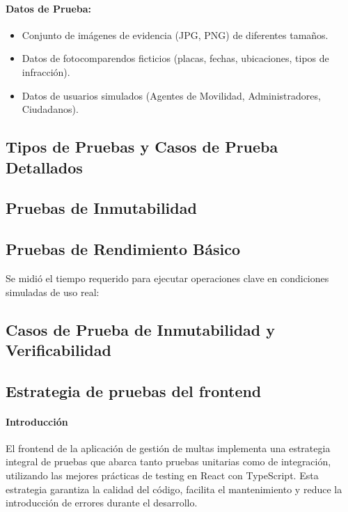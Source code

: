 \documentclass[
    letterpaper, 
    man,   
    spanish,
    12pt,
    donotrepeattitle,
    floatsintext,
    hidelinks %
]{apa7}
\begin{document}
\paragraph{Datos de Prueba:}
\begin{itemize}
    \item Conjunto de imágenes de evidencia (JPG, PNG) de diferentes tamaños. 
    \item Datos de fotocomparendos ficticios (placas, fechas, ubicaciones, tipos de infracción). 
    \item Datos de usuarios simulados (Agentes de Movilidad, Administradores, Ciudadanos).
\end{itemize}

\subsection{Tipos de Pruebas y Casos de Prueba Detallados}



\subsection{Pruebas de Inmutabilidad}



\subsection{Pruebas de Rendimiento Básico}

Se midió el tiempo requerido para ejecutar operaciones clave en condiciones simuladas de uso real:



\subsection{Casos de Prueba de Inmutabilidad y Verificabilidad}



\subsection{Estrategia de pruebas del frontend}

\paragraph{Introducción}
El frontend de la aplicación de gestión de multas implementa una estrategia integral de pruebas que abarca tanto pruebas unitarias como de integración, utilizando las mejores prácticas de testing en React con TypeScript. Esta estrategia garantiza la calidad del código, facilita el mantenimiento y reduce la introducción de errores durante el desarrollo.
\end{document}
